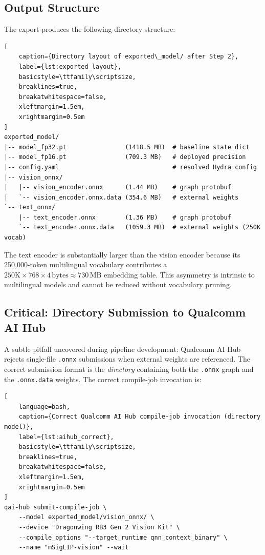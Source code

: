 \documentclass[../main.tex]{subfiles}
\begin{document}
\subsection{Output Structure}

\noindent The export produces the following directory structure:

\begin{lstlisting}[
    caption={Directory layout of exported\_model/ after Step 2},
    label={lst:exported_layout},
    basicstyle=\ttfamily\scriptsize,
    breaklines=true,
    breakatwhitespace=false,
    xleftmargin=1.5em,
    xrightmargin=0.5em
]
exported_model/
|-- model_fp32.pt                (1418.5 MB)  # baseline state dict
|-- model_fp16.pt                (709.3 MB)   # deployed precision
|-- config.yaml                               # resolved Hydra config
|-- vision_onnx/
|   |-- vision_encoder.onnx      (1.44 MB)    # graph protobuf
|   `-- vision_encoder.onnx.data (354.6 MB)   # external weights
`-- text_onnx/
    |-- text_encoder.onnx        (1.36 MB)    # graph protobuf
    `-- text_encoder.onnx.data   (1059.3 MB)  # external weights (250K vocab)
\end{lstlisting}

\noindent The text encoder is substantially larger than the vision encoder because its 250,000-token multilingual vocabulary contributes a \mbox{$250\text{K} \times 768 \times 4\,\text{bytes} \approx 730\,\text{MB}$} embedding table. This asymmetry is intrinsic to multilingual models and cannot be reduced without vocabulary pruning.

\subsection{Critical: Directory Submission to Qualcomm AI Hub}

\noindent A subtle pitfall uncovered during pipeline development: Qualcomm AI Hub rejects single-file \texttt{.onnx} submissions when external weights are referenced. The correct submission format is the \textit{directory} containing both the \texttt{.onnx} graph and the \texttt{.onnx.data} weights. The correct compile-job invocation is:

\begin{lstlisting}[
    language=bash,
    caption={Correct Qualcomm AI Hub compile-job invocation (directory model)},
    label={lst:aihub_correct},
    basicstyle=\ttfamily\scriptsize,
    breaklines=true,
    breakatwhitespace=false,
    xleftmargin=1.5em,
    xrightmargin=0.5em
]
qai-hub submit-compile-job \
    --model exported_model/vision_onnx/ \
    --device "Dragonwing RB3 Gen 2 Vision Kit" \
    --compile_options "--target_runtime qnn_context_binary" \
    --name "mSigLIP-vision" --wait
\end{lstlisting}
\end{document}
